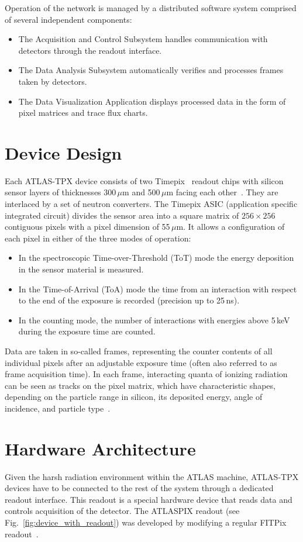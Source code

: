 \documentclass[conference]{IEEEtran}
\begin{document}
Operation of the network is managed by a distributed software system comprised of several independent components:
~
\begin{itemize}
\item The Acquisition and Control Subsystem handles communication with detectors through the readout interface.
\item The Data Analysis Subsystem automatically verifies and processes frames taken by detectors.
\item The Data Visualization Application displays processed data in the form of pixel matrices and trace flux charts.
\end{itemize}

\section{\label{sec:device}Device Design}
Each ATLAS-TPX device consists of two Timepix~\cite{Llopart2007} readout chips with silicon sensor layers of thicknesses 300\,$\mu$m and 500\,$\mu$m facing each other~\cite{Bergmann_ATLASTPX_2016}. They are interlaced by a set of neutron converters. The Timepix ASIC (application specific integrated circuit) divides the sensor area into a square matrix of $256 \times 256$ contiguous pixels with a pixel dimension of 55\,$\mu$m. It allows a configuration of each pixel in either of the three modes of operation: 
~
\begin{itemize}
\item In the spectroscopic Time-over-Threshold (ToT) mode the energy deposition in the sensor material is measured.
\item In the Time-of-Arrival (ToA) mode the time from an interaction with respect to the end of the exposure is recorded (precision up to 25\,ns).
\item In the counting mode, the number of interactions with energies above 5\,keV during the exposure time are counted.
\end{itemize}

Data are taken in so-called frames, representing the counter contents of all individual pixels after an adjustable exposure time (often also referred to as frame acquisition time). In each frame, interacting quanta of ionizing radiation can be seen as tracks on the pixel matrix, which have characteristic shapes, depending on the particle range in silicon, its deposited energy, angle of incidence, and particle type~\cite{Holy2008}.

\section{\label{sec:hardware}Hardware Architecture}
Given the harsh radiation environment within the ATLAS machine, ATLAS-TPX devices have to be connected to the rest of the system through a dedicated readout interface. This readout is a special hardware device that reads data and controls acquisition of the detector. The ATLASPIX readout (see Fig.~\ref{fig:device_with_readout}) was developed by modifying a regular FITPix readout~\cite{FITPix}.
\end{document}
